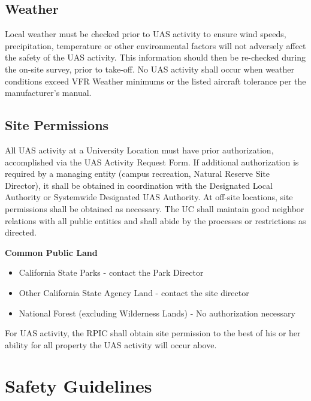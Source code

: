 \documentclass[
]{book}
\providecommand{\tightlist}{%
  \setlength{\itemsep}{0pt}\setlength{\parskip}{0pt}}
\begin{document}
\subsection{Weather}\label{weather}

Local weather must be checked prior to UAS activity to ensure wind speeds, precipitation, temperature or other environmental factors will not adversely affect the safety of the UAS activity. This information should then be re-checked during the on-site survey, prior to take-off. No UAS activity shall occur when weather conditions exceed VFR Weather minimums or the listed aircraft tolerance per the manufacturer's manual.

\subsection{Site Permissions}\label{site-permissions}

All UAS activity at a University Location must have prior authorization, accomplished via the UAS Activity Request Form. If additional authorization is required by a managing entity (campus recreation, Natural Reserve Site Director), it shall be obtained in coordination with the Designated Local Authority or Systemwide Designated UAS Authority. At off-site locations, site permissions shall be obtained as necessary. The UC shall maintain good neighbor relations with all public entities and shall abide by the processes or restrictions as directed.

\textbf{Common Public Land}

\begin{itemize}
\tightlist
\item
  California State Parks - contact the Park Director
\item
  Other California State Agency Land - contact the site director
\item
  National Forest (excluding Wilderness Lands) - No authorization necessary
\end{itemize}

For UAS activity, the RPIC shall obtain site permission to the best of his or her ability for all property the UAS activity will occur above.

\section{Safety Guidelines}\label{safety-guidelines}
\end{document}
